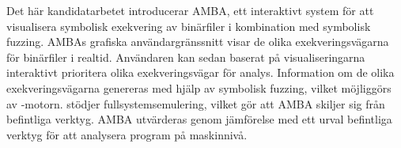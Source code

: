 Det här kandidatarbetet introducerar AMBA, ett interaktivt system för att visualisera symbolisk exekvering av binärfiler i kombination med symbolisk fuzzing.
AMBAs grafiska användargränssnitt visar de olika exekveringsvägarna för binärfiler i realtid.
Användaren kan sedan baserat på visualiseringarna interaktivt prioritera olika exekveringsvägar för analys.
Information om de olika exekveringsvägarna genereras med hjälp av symbolisk fuzzing, vilket möjliggörs av \stoe{}-motorn.
\stoe{} stödjer fullsystemsemulering, vilket gör att AMBA skiljer sig från befintliga verktyg.
AMBA utvärderas genom jämförelse med ett urval befintliga verktyg för att analysera program på maskinnivå.
